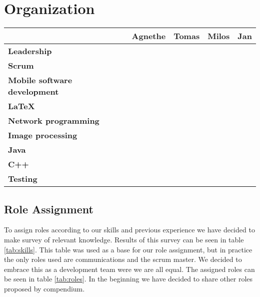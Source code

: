\documentclass{article}
\newcommand{\ra}[1]{\renewcommand{\arraystretch}{#1}}
\newcommand{\colorA}{\cellcolor{green!100}}
\newcommand{\colorB}{\cellcolor{green!60}}
\newcommand{\colorC}{\cellcolor{yellow!75}}
\newcommand{\colorD}{\cellcolor{orange!90}}
\newcommand{\colorE}{\cellcolor{red!80}}
\begin{document}
\section{Organization}

\begin{table*}\centering \ra{1.3}
    \caption{Skills and previous experience table. Coding:
        \textcolor{green!100}{$\bullet$} expert,
        \textcolor{green!60}{$\bullet$} experienced,
        \textcolor{yellow!75}{$\bullet$} neutral,
        \textcolor{orange!90}{$\bullet$} little experience,
        \textcolor{red!80}{$\bullet$} no experience}
    \label{tab:skills}
    \vspace{2mm}
    \begin{tabular}{lcccc}
    \toprule
                                & Agnethe   & Tomas & Milos & Jan \\
    \midrule
    \textbf{Leadership                 } & \colorB & \colorE & \colorD & \colorC \\ 
    \textbf{Scrum                      } & \colorB & \colorE & \colorE & \colorE \\ 
    \textbf{Mobile software development} & \colorC & \colorE & \colorB & \colorE \\ 
    \textbf{\LaTeX                     } & \colorE & \colorB & \colorE & \colorB \\ 
    \textbf{Network programming        } & \colorD & \colorC & \colorC & \colorC \\ 
    \textbf{Image processing           } & \colorE & \colorC & \colorE & \colorD \\ 
    \textbf{Java                       } & \colorC & \colorD & \colorA & \colorE \\ 
    \textbf{C++                        } & \colorE & \colorB & \colorC & \colorB \\ 
    \textbf{Testing                    } & \colorE & \colorB & \colorD & \colorC \\
    \bottomrule
    \end{tabular}
\end{table*}


\subsection{Role Assignment}
To assign roles according to our skills and previous experience we have decided to make survey of relevant knowledge. 
Results of this survey can be seen in table \ref{tab:skills}. 
This table was used as a base for our role assignment, but in practice the only roles used are communications and the scrum master. We decided to embrace this as a development team were we are all equal. 
The assigned roles can be seen in table \ref{tab:roles}. 
In the beginning we have decided to share other roles proposed by compendium.
\end{document}
